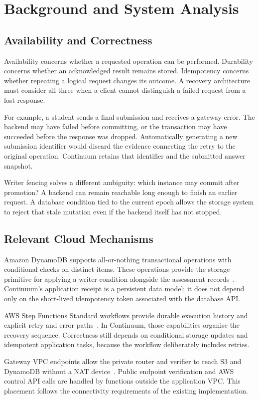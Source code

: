 \chapter{Background and System Analysis}
\section{Availability and Correctness}
Availability concerns whether a requested operation can be performed. Durability concerns whether an acknowledged result remains stored. Idempotency concerns whether repeating a logical request changes its outcome. A recovery architecture must consider all three when a client cannot distinguish a failed request from a lost response.

For example, a student sends a final submission and receives a gateway error. The backend may have failed before committing, or the transaction may have succeeded before the response was dropped. Automatically generating a new submission identifier would discard the evidence connecting the retry to the original operation. Continuum retains that identifier and the submitted answer snapshot.

Writer fencing solves a different ambiguity: which instance may commit after promotion? A backend can remain reachable long enough to finish an earlier request. A database condition tied to the current epoch allows the storage system to reject that stale mutation even if the backend itself has not stopped.
\section{Relevant Cloud Mechanisms}
Amazon DynamoDB supports all-or-nothing transactional operations with conditional checks on distinct items. These operations provide the storage primitive for applying a writer condition alongside the assessment records~\cite{aws-transactions}. Continuum's application receipt is a persistent data model; it does not depend only on the short-lived idempotency token associated with the database API.

AWS Step Functions Standard workflows provide durable execution history and explicit retry and error paths~\cite{aws-workflows}. In Continuum, those capabilities organise the recovery sequence. Correctness still depends on conditional storage updates and idempotent application tasks, because the workflow deliberately includes retries.

Gateway VPC endpoints allow the private router and verifier to reach S3 and DynamoDB without a NAT device~\cite{aws-endpoints}. Public endpoint verification and AWS control API calls are handled by functions outside the application VPC. This placement follows the connectivity requirements of the existing implementation.
